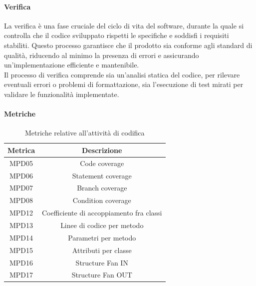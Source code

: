 \documentclass[10pt]{article}
\begin{document}
\begin{justify}
        \paragraph{Verifica}
        La verifica è una fase cruciale del ciclo di vita del software, durante la quale si controlla che il codice sviluppato rispetti le specifiche e soddisfi i requisiti stabiliti. Questo processo garantisce che il prodotto sia conforme agli standard di qualità, riducendo al minimo la presenza di errori e assicurando un'implementazione efficiente e mantenibile.\\
        Il processo di verifica comprende sia un'analisi statica del codice, per rilevare eventuali errori o problemi di formattazione, sia l'esecuzione di test mirati per validare le funzionalità implementate.\\

        \paragraph{Metriche}
        \begin{table}[H]
          \centering
          \begin{tabular}{|c|c|}
            \hline
            \textbf{Metrica} & \textbf{Descrizione} \\
            \hline
            MPD05 & Code coverage\\
            \hline
            MPD06 & Statement coverage\\
            \hline
            MPD07 & Branch coverage\\
            \hline
            MPD08 & Condition coverage\\
            \hline
            MPD12 & Coefficiente di accoppiamento fra classi\\
            \hline
            MPD13 & Linee di codice per metodo\\
            \hline
            MPD14 & Parametri per metodo\\
            \hline
            MPD15 & Attributi per classe\\
            \hline
            MPD16 & Structure Fan IN\\
            \hline
            MPD17 & Structure Fan OUT\\
            \hline
          \end{tabular}
          \caption{Metriche relative all'attività di codifica}
        \end{table}


\end{justify}
\end{document}
